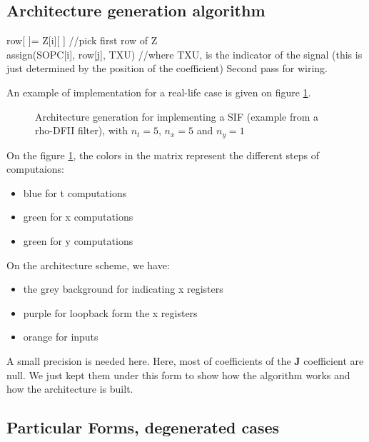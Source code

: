 \subsection{Architecture generation algorithm}

	\begin{algorithm}[H]
	 {
	 	row[ ]= Z[i][ ] //pick first row of Z \\
	 	 {
	 		assign(SOPC[i], row[j], TXU) //where TXU, is the indicator of the signal (this is just determined by the position of the coefficient)
	 	}
		Second pass for wiring.
	}
	\end{algorithm}

	An example of implementation for a real-life case is given on figure \ref{fig:SIFimpl}.

	\begin{figure}[!h]
	\begin{center}
	\scalebox{7}{}
	\end{center}
	\caption{ Architecture generation for implementing a SIF (example from a rho-DFII filter), with $n_t=5$, $n_x=5$ and $n_y=1$ \label{fig:SIFimpl}}
	\end{figure}

	On the figure \ref{fig:SIFimpl}, the colors in the matrix represent the different steps of computaions:
	\begin{itemize}
		\item blue for t computations
		\item green for x computations
		\item green for y computations
	\end{itemize}

	On the architecture scheme, we have:
	\begin{itemize}
		\item the grey background for indicating x registers
		\item purple for loopback form the x registers
		\item orange for inputs
	\end{itemize}
	
	A small precision is needed here.
	Here, most of coefficients of the $\boldsymbol{J}$ coefficient are null.
	We just kept them under this form to show how the algorithm works and how the architecture is built.
	

\subsection{Particular Forms, degenerated cases}
